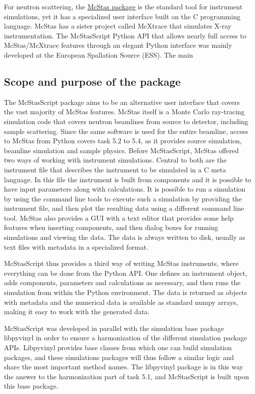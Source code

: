 \documentclass[11pt, a4paper]{article}
\begin{document}
For neutron scattering, the \href{https://www.mcstas.org}{McStas
  package} is the standard tool for instrument simulations, yet it has a
specialized user interface built on the C programming language. McStas has a
sister project called McXtrace that simulates X-ray instrumentation.
The McStasScript Python API that allows
nearly full access to McStas/McXtrace features through an elegant Python
interface was mainly developed at the European Spallation Source (ESS). The main


\subsection{Scope and purpose of the package}
The McStasScript package aims to be an alternative user interface that covers the vast majority of McStas features. McStas itself is a Monte Carlo ray-tracing simulation code that covers neutron beamlines from source to detector, including sample scattering. Since the same software is used for the entire beamline, access to McStas from Python covers task 5.2 to 5.4, as it provides source simulation, beamline simulation and sample physics. Before McStasScript, McStas offered two ways of working with instrument simulations. Central to both are the instrument file that describes the instrument to be simulated in a C meta language. In this file the instrument is built from components and it is possible to have input parameters along with calculations. It is possible to run a simulation by using the command line tools to execute such a simulation by providing the instrument file, and then plot the resulting data using a different command line tool. McStas also provides a GUI with a text editor that provides some help features when inserting components, and then dialog boxes for running simulations and viewing the data. The data is always written to disk, usually as text files with metadata in a specialized format.

McStasScript thus provides a third way of writing McStas instruments, where everything can be done from the Python API. One defines an instrument object, adds components, parameters and calculations as necessary, and then runs the simulation from within the Python environment. The data is returned as objects with metadata and the numerical data is available as standard numpy arrays, making it easy to work with the generated data.

McStasScript was developed in parallel with the simulation base package
libpyvinyl in order to ensure a harmonization of the different simulation
package APIs. Libpyvinyl provides base classes from which one can build
simulation packages, and these simulations packages will thus follow a similar
logic and share the most important method names. The libpyvinyl package is in
this way the answer to the harmonization part of task 5.1, and McStasScript is
built upon this base package.
\end{document}
